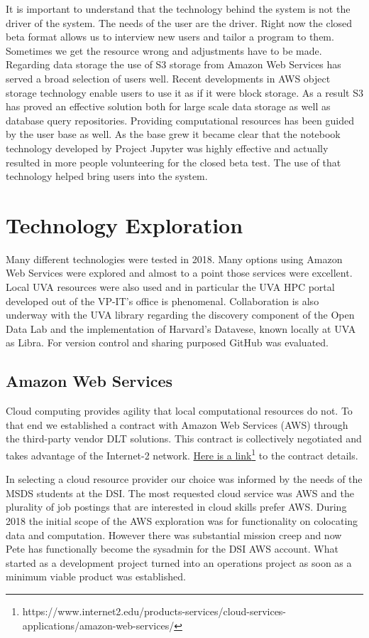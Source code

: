 It is important to understand that the technology behind the system is not the driver of the system. The needs of the user are the driver. Right now the closed beta format allows us to interview new users and tailor a program to them. Sometimes we get the resource wrong and adjustments have to be made.
Regarding data storage the use of S3 storage from Amazon Web Services has served a broad selection of users well. Recent developments in AWS object storage technology enable users to use it as if it were block storage. As a result S3 has proved an effective solution both for large scale data storage as well as database query repositories.
Providing computational resources has been guided by the user base as well. As the base grew it became clear that the notebook technology developed by Project Jupyter was highly effective and actually resulted in more people volunteering for the closed beta test. The use of that technology helped bring users into the system.


\section{Technology Exploration}
\label{techsolu}
Many different technologies were tested in 2018. Many options using Amazon Web Services were explored and almost to a point those services were excellent. Local UVA resources were also used and in particular the UVA HPC portal developed out of the VP-IT's office is phenomenal. Collaboration is also underway with the UVA library regarding the discovery component of the Open Data Lab and the implementation of Harvard's Datavese, known locally at UVA as Libra. For version control and sharing purposed GitHub was evaluated.

\subsection{Amazon Web Services}
Cloud computing provides agility that local computational resources do not. To that end we established a contract with Amazon Web Services (AWS) through the third-party vendor DLT solutions. This contract is collectively negotiated and takes advantage of the Internet-2 network. \href{https://www.internet2.edu/products-services/cloud-services-applications/amazon-web-services/}{Here is a link\footnote{\url{https://www.internet2.edu/products-services/cloud-services-applications/amazon-web-services/}} to the contract details}.

In selecting a cloud resource provider our choice was informed by the needs of the  MSDS students at the DSI. The most requested cloud service was AWS and the plurality of job postings that are interested in cloud skills prefer AWS. During 2018 the initial scope of the AWS exploration was for functionality on colocating data and computation. However there was substantial mission creep and now Pete has functionally become the sysadmin for the DSI AWS account. What started as a development project turned into an operations project as soon as a minimum viable product was established.

